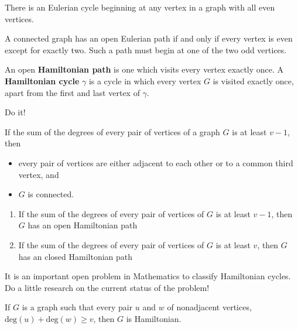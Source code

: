 \begin{corollary} There is an Eulerian cycle beginning at any vertex in a graph with all even vertices.
\end{corollary}

\begin{corollary} A connected graph has an open Eulerian path if and only if every vertex is even except for exactly two.  Such a path must begin at one of the two odd vertices.
\end{corollary}

\begin{definition} An open \textbf{Hamiltonian path} is one which visits every vertex exactly once. A \textbf{Hamiltonian cycle} $\gamma$ is a cycle in which every vertex $G$ is visited exactly once, apart from the first and last vertex of $\gamma$.
\end{definition}
\begin{examples} Do it!
\end{examples}

\begin{lemma} If the sum of the degrees of every pair of vertices of a graph $G$ is at least $v-1$, then
\begin{itemize}
    \item every pair of vertices are either adjacent to each other or to a common third vertex, and
    \item $G$ is connected.
\end{itemize}
\end{lemma}

\begin{theorem}\leavevmode
\begin{enumerate}
    \item If the sum of the degrees of every pair of vertices of $G$ is at least $v-1$, then $G$ has an open Hamiltonian path
    \item If the sum of the degrees of every pair of vertices of $G$ is at least $v$, then $G$ has an closed Hamiltonian path
\end{enumerate}
\end{theorem}

\begin{remark} It is an important open problem in Mathematics to classify Hamiltonian cycles.  Do a little research on the current status of the problem!
\end{remark}

\begin{theorem} If $G$ is a graph such that every pair $u$ and $w$ of nonadjacent vertices, $\text{deg}(u) + \text{deg}(w) \geq v$, then $G$ is Hamiltonian.
\end{theorem}

